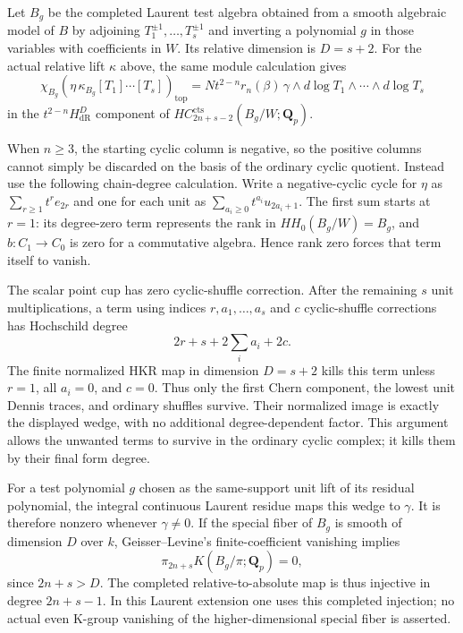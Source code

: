 \begin{remark}
Let $B_g$ be the completed Laurent test algebra obtained from a
smooth algebraic model of $B$ by adjoining
$T_1^{\pm1},\ldots,T_s^{\pm1}$ and inverting a polynomial $g$
in those variables with coefficients in $W$. Its relative
dimension is $D=s+2$. For the actual relative lift $\kappa$ above,
the same module calculation gives
\[
 \chi_{B_g}\!\left(\eta\,\kappa_{B_g}
                         [T_1]\cdots[T_s]\right)_{\mathrm{top}}
   =N t^{2-n}r_n(\beta)\,
           \gamma\wedge d\log T_1\wedge\cdots\wedge d\log T_s
\]
in the $t^{2-n}H^D_{\mathrm{dR}}$ component of
$HC_{2n+s-2}^{\mathrm{cts}}(B_g/W;\mathbf Q_p)$.

When $n\geq3$, the starting cyclic column is negative, so the
positive columns cannot simply be discarded on the basis of the
ordinary cyclic quotient. Instead use the following chain-degree
calculation. Write a negative-cyclic cycle for $\eta$ as
$\sum_{r\geq1}t^r e_{2r}$ and one for each unit as
$\sum_{a_i\geq0}t^{a_i}u_{2a_i+1}$.
The first sum starts at $r=1$: its degree-zero term represents the
rank in $HH_0(B_g/W)=B_g$, and $b:C_1\to C_0$ is zero for a
commutative algebra. Hence rank zero forces that term itself to
vanish.

The scalar point cup has zero cyclic-shuffle correction. After
the remaining $s$ unit multiplications, a term using indices
$r,a_1,\ldots,a_s$ and $c$ cyclic-shuffle corrections has
Hochschild degree
\[
                   2r+s+2\sum_i a_i+2c.
\]
The finite normalized HKR map in dimension $D=s+2$ kills this
term unless $r=1$, all $a_i=0$, and $c=0$. Thus only the first
Chern component, the lowest unit Dennis traces, and ordinary
shuffles survive. Their normalized image is exactly the
displayed wedge, with no additional degree-dependent factor.
This argument allows the unwanted terms to survive in the
ordinary cyclic complex; it kills them by their final form degree.

For a test polynomial $g$ chosen as the same-support unit lift of
its residual polynomial, the integral continuous Laurent residue
maps this wedge to $\gamma$. It is therefore nonzero whenever
$\gamma\ne0$. If the special fiber of $B_g$ is smooth of dimension
$D$ over $k$, Geisser--Levine's finite-coefficient vanishing
\cite[Theorem~8.4]{GeisserLevineCharP} implies
\[
 \pi_{2n+s}K(B_g/\pi;\mathbf Q_p)=0,
\]
since $2n+s>D$. The completed relative-to-absolute map is thus
injective in degree $2n+s-1$. In this Laurent extension one uses
this completed injection; no actual even K-group vanishing of
the higher-dimensional special fiber is asserted.
\end{remark}


